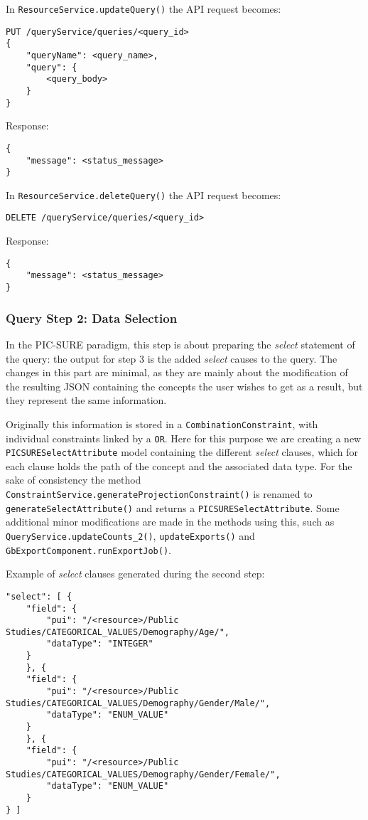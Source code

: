 In  \verb|ResourceService.updateQuery()| the API request becomes:
\begin{verbatim}
PUT /queryService/queries/<query_id>
{
    "queryName": <query_name>,
    "query": {
        <query_body>
    }
}
\end{verbatim}

Response:
\begin{verbatim}
{
    "message": <status_message>
} 
\end{verbatim}

In  \verb|ResourceService.deleteQuery()| the API request becomes:
\begin{verbatim}
DELETE /queryService/queries/<query_id>
\end{verbatim}

Response:
\begin{verbatim}
{
    "message": <status_message>
} 
\end{verbatim}


\subsubsection{Query Step 2: Data Selection}

In the PIC-SURE paradigm, this step is about preparing the \emph{select} statement of the query: the output for step 3 is the added \emph{select} causes to the query.
The changes in this part are minimal, as they are mainly about the modification of the resulting JSON containing the concepts the user wishes to get as a result, but they represent the same information.

Originally this information is stored in a \verb|CombinationConstraint|, with individual constraints linked by a \verb|OR|.
Here for this purpose we are creating a new \verb|PICSURESelectAttribute| model containing the different \emph{select} clauses, which for each clause holds the path of the concept and the associated data type.
For the sake of consistency the method \verb|ConstraintService.generateProjectionConstraint()| is renamed to \verb|generateSelectAttribute()| and returns a \verb|PICSURESelectAttribute|.
Some additional minor modifications are made in the methods using this, such as \verb|QueryService.updateCounts_2()|, \verb|updateExports()| and \verb|GbExportComponent.runExportJob()|.

Example of \emph{select} clauses generated during the second step:
\begin{verbatim}
"select": [ {
    "field": {
        "pui": "/<resource>/Public Studies/CATEGORICAL_VALUES/Demography/Age/",
        "dataType": "INTEGER"
    }
    }, {
    "field": {
        "pui": "/<resource>/Public Studies/CATEGORICAL_VALUES/Demography/Gender/Male/",
        "dataType": "ENUM_VALUE"
    }
    }, {
    "field": {
        "pui": "/<resource>/Public Studies/CATEGORICAL_VALUES/Demography/Gender/Female/",
        "dataType": "ENUM_VALUE"
    }
} ]
\end{verbatim}


